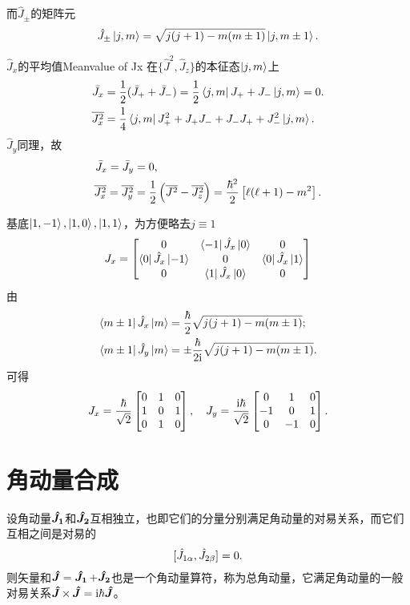 而$\hat J_\pm$的矩阵元
\begin{align}
	\hat J_\pm\left\vert j,m\right\rangle=\sqrt{j(j+1)-m(m\pm 1)}\left\vert j,m\pm 1\right\rangle.
\end{align}
\begin{example}{$\hat J_x$的平均值}{Meanvalue of Jx}
	在$\{\hat J^2,\hat J_z\}$的本征态$\left\vert j,m\right\rangle$上
	\begin{align*}
		\bar J_x&=\frac12(\bar J_++\bar J_-)=\frac12\left\langle j,m\right\vert J_++J_-\left\vert j,m\right\rangle=0.\\
		\overline{J_x^2}&=\frac14\left\langle j,m\right\vert J_+^2+J_+J_-+J_-J_++J_-^2\left\vert j,m\right\rangle.
	\end{align*}
	$\hat J_y$同理，故
	\begin{align*}
		\bar J_x=\bar J_y&=0,\\
		\overline{J_x^2}=\overline{J_y^2}&=\frac12\left(\overline{J^2}-\overline{J_z^2}\right)=\frac{\hbar^2}2\left[\ell(\ell+1)-m^2\right].
	\end{align*}
\end{example}
\begin{example}{}{}
	基底$\left\vert 1,-1\right\rangle,\left\vert 1,0\right\rangle,\left\vert 1,1\right\rangle$，为方便略去$j\equiv 1$ %
	\begin{align*}
		J_x=\begin{bmatrix}
			0&\left\langle -1\right\vert\hat J_x\left\vert 0\right\rangle&0\\
			\left\langle 0\right\vert\hat J_x\left\vert -1\right\rangle&0&\left\langle 0\right\vert\hat J_x\left\vert 1\right\rangle\\
			0&\left\langle 1\right\vert\hat J_x\left\vert 0\right\rangle&0
		\end{bmatrix}
	\end{align*}
	由
	\begin{align*}
		\left\langle m\pm 1\right\vert\hat J_x\left\vert m\right\rangle&=\frac\hbar{2}\sqrt{j(j+1)-m(m\pm 1)};\\
		\left\langle m\pm 1\right\vert\hat J_y\left\vert m\right\rangle&=\pm\frac\hbar{2\mathrm{i}}\sqrt{j(j+1)-m(m\pm 1)}.
	\end{align*}
	可得 
	\begin{align*}
		J_x=\frac\hbar{\sqrt2}\begin{bmatrix}
			0&1&0\\1&0&1\\0&1&0
		\end{bmatrix},\quad J_y=\frac{\mathrm{i}\hbar}{\sqrt2}\begin{bmatrix}
			0&1&0\\-1&0&1\\0&-1&0
		\end{bmatrix}.
	\end{align*}
\end{example}
\section{角动量合成}
设角动量$\bm{\hat J_1}\!\mathop{}$和$\bm{\hat J_2}\!\mathop{}$互相独立，也即它们的分量分别满足角动量的对易关系，而它们互相之间是对易的
\[
	[\hat J_{1\alpha},\hat J_{2\beta}]=0.
\]
则矢量和$\bm{\hat J}\!\mathop{}=\bm{\hat J_1}\!\mathop{}+\bm{\hat J_2}\!\mathop{}$也是一个角动量算符，称为总角动量，它满足角动量的一般对易关系$\bm{\hat J}\!\mathop{}\times\,\bm{\hat J}\!\mathop{}=\mathrm{i}\hbar\bm{\hat J}\!\mathop{}$。

